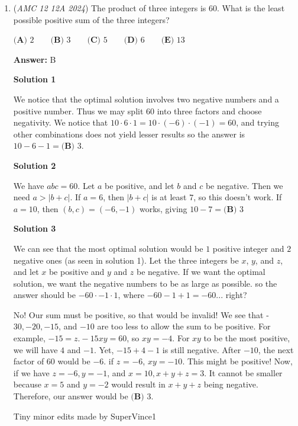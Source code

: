 \begin{enumerate}
	\item (\textit{AMC 12 12A 2024}) The product of three integers is $60$. What is the least possible positive sum of the three integers?


 $\textbf{(A) } 2 \qquad \textbf{(B) } 3 \qquad \textbf{(C) } 5 \qquad \textbf{(D) } 6 \qquad \textbf{(E) } 13$

 \textbf{Answer: }B



\textbf{Solution 1}

We notice that the optimal solution involves two negative numbers and a positive number. Thus we may split $60$ into three factors and choose negativity. We notice that $10\cdot6\cdot1=10\cdot(-6)\cdot(-1)=60$, and trying other combinations does not yield lesser results so the answer is $10-6-1=\boxed{\textbf{(B) }3}$.

 



\textbf{Solution 2}

We have $abc = 60$. Let $a$ be positive, and let $b$ and $c$ be negative. Then we need $a > |b + c|$. If $a = 6$, then $|b + c|$ is at least $7$, so this doesn't work. If $a = 10$, then $(b,c) = (-6,-1)$ works, giving $10 - 7 = \boxed{\textbf{(B) }3}$




\textbf{Solution 3}

We can see that the most optimal solution would be $1$ positive integer and $2$ negative ones (as seen in solution 1). Let the three integers be $x$, $y$, and $z$, and let $x$ be positive and $y$ and $z$ be negative. If we want the optimal solution, we want the negative numbers to be as large as possible. so the answer should be $-60 \cdot -1 \cdot 1$, where $-60 - 1 + 1 = -60$... right?

 No! Our sum must be positive, so that would be invalid! We see that -$30, -20, -15$, and $-10$ are too less to allow the sum to be positive. For example, $-15 = z. -15xy=60$, so $xy = -4$. For $xy$ to be the most positive, we will have $4$ and $-1$. Yet, $-15+4-1$ is still negative. After $-10$, the next factor of $60$ would be $-6$. if $z$ = $-6$, $xy = -10$. This might be positive! Now, if we have $z = -6, y = -1$, and $x = 10, x + y + z = 3$. It cannot be smaller because $x = 5$ and $y = -2$ would result in $x + y + z$ being negative. Therefore, our answer would be $\boxed{\textbf{(B) }3}$.

 Tiny minor edits made by SuperVince1

 



\end{enumerate}

